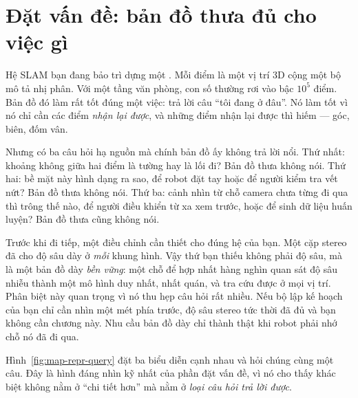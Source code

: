\documentclass[../../deep_learning.tex]{subfiles}
\begin{document}
\section{Đặt vấn đề: bản đồ thưa đủ cho việc gì}
Hệ SLAM bạn đang bảo trì dựng một . Mỗi điểm là một vị trí 3D cộng một bộ mô tả nhị phân. Với một tầng văn phòng, con số thường rơi vào bậc \(10^5\) điểm. Bản đồ đó làm rất tốt đúng một việc: trả lời câu ``tôi đang ở đâu''. Nó làm tốt vì nó chỉ cần các điểm \emph{nhận lại được}, và những điểm nhận lại được thì hiếm --- góc, biên, đốm vân.

Nhưng có ba câu hỏi hạ nguồn mà chính bản đồ ấy không trả lời nổi. Thứ nhất: khoảng không giữa hai điểm là tường hay là lối đi? Bản đồ thưa không nói. Thứ hai: bề mặt này hình dạng ra sao, để robot đặt tay hoặc để người kiểm tra vết nứt? Bản đồ thưa không nói. Thứ ba: cảnh nhìn từ chỗ camera chưa từng đi qua thì trông thế nào, để người điều khiển từ xa xem trước, hoặc để sinh dữ liệu huấn luyện? Bản đồ thưa cũng không nói.

Trước khi đi tiếp, một điều chỉnh cần thiết cho đúng hệ của bạn. Một cặp stereo đã cho độ sâu dày ở \emph{mỗi} khung hình. Vậy thứ bạn thiếu không phải độ sâu, mà là một bản đồ dày \emph{bền vững}: một chỗ để hợp nhất hàng nghìn quan sát độ sâu nhiễu thành một mô hình duy nhất, nhất quán, và tra cứu được ở mọi vị trí. Phân biệt này quan trọng vì nó thu hẹp câu hỏi rất nhiều. Nếu bộ lập kế hoạch của bạn chỉ cần nhìn một mét phía trước, độ sâu stereo tức thời đã đủ và bạn không cần chương này. Nhu cầu bản đồ dày chỉ thành thật khi robot phải nhớ chỗ nó đã đi qua.

Hình~\ref{fig:map-repr-query} đặt ba biểu diễn cạnh nhau và hỏi chúng cùng một câu. Đây là hình đáng nhìn kỹ nhất của phần đặt vấn đề, vì nó cho thấy khác biệt không nằm ở ``chi tiết hơn'' mà nằm ở \emph{loại câu hỏi trả lời được}.
\end{document}
